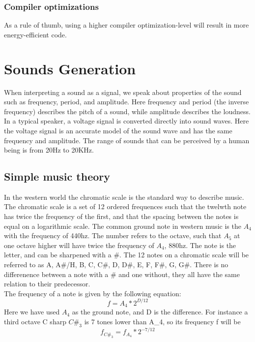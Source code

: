 \subsubsection{Compiler optimizations}
As a rule of thumb, using a higher compiler optimization-level will result in more energy-efficient code.


%


\section{Sounds Generation}\label{sec:sound-generation}
When interpreting a sound as a signal, we speak about properties of the sound such as frequency, period, and amplitude. Here frequency and period (the inverse frequency) describes the pitch of a sound, while amplitude describes the loudness. In a typical speaker, a voltage signal is converted directly into sound waves. Here the voltage signal is an accurate model of the sound wave and has the same frequency and amplitude. The range of sounds that can be perceived by a human being is from 20Hz to 20KHz.\cite{compendium}

\subsection{Simple music theory}
In the western world the chromatic scale is the standard way to describe music. The chromatic scale is a set of 12 ordered frequences such that the twelwth note has twice the frequency of the first, and that the spacing between the notes is equal on a logarithmic scale. The common ground note in western music is the $A_{4}$ with the frequency of 440hz. The number refers to the octave, such that $A_{5}$ at one octave higher will have twice the frequency of $A_{4}$, 880hz. The note is the letter, and can be sharpened with a \#. The 12 notes on a chromatic scale will be referred to as A, A\#/H, B, C, C\#, D, D\#, E, F, F\#, G, G\#. There is no differenence between a note with a \# and one without, they all have the same relation to their predecessor. \\
The frequency of a note is given by the following equation: $$f = A_{4}*2^{D/12}$$
Here we have used $A_4$ as the ground note, and D is the difference. For instance a third octave C sharp $C\#_3$ is 7 tones lower than A_4, so its frequency f will be $$f_{C\#_{3}} = f_{A_{4}}*2^{-7/12}$$
